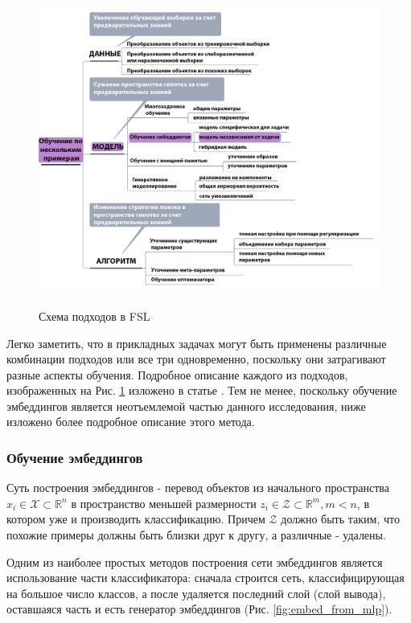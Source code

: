 \begin{figure}[!h]
\caption{Схема подходов в FSL}
\centering
\includegraphics[width=16cm]{Images/FSL_taxomony_rus_noback.png}
\label{fig:FSL_taxomony_rus_noback}
\end{figure}

Легко заметить, что в прикладных задачах могут быть применены различные комбинации подходов или все три одновременно, поскольку они затрагивают разные аспекты обучения. Подробное описание каждого из подходов, изображенных на Рис. \ref{fig:FSL_taxomony_rus_noback} изложено в статье \cite{FSLsurvey}. Тем не менее, поскольку обучение эмбеддингов является неотъемлемой частью данного исследования, ниже изложено более подробное описание этого метода.

\newpage
\subsubsection{Обучение эмбеддингов}

\label{subsec:EmbeddingLearning}

    Суть построения эмбеддингов \cite{ReviewConvolutionArchitectureEmbedding} - перевод объектов из начального пространства ${x_i}\in\mathcal{X}\subset\mathbb{R}^n$ в пространство меньшей размерности ${z_i}\in\mathcal{Z}\subset\mathbb{R}^m, m < n$, в котором уже и производить классификацию. Причем $\mathcal{Z}$ должно быть таким, что похожие примеры должны быть близки друг к другу, а различные - удалены.

    Одним из наиболее простых методов построения сети эмбеддингов является использование части классификатора: сначала строится сеть, классифицирующая на большое число классов, а после удаляется последний слой (слой вывода), оставшаяся часть и есть генератор эмбеддингов (Рис. \ref{fig:embed_from_mlp}).


